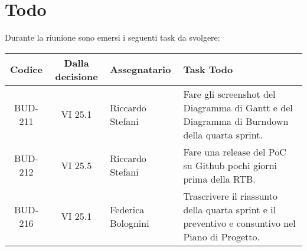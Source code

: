 
\section{Todo}

Durante la riunione sono emersi i seguenti task da svolgere:

\vspace{0.5cm}

\begin{table}[htbp]
\centering
{}
\begin{tabular}{|c|c|p{}|p{}|}
    \hline
    \rowcolor[gray]{0.75}
    \textbf{Codice} & \textbf{Dalla decisione} & \textbf{Assegnatario} & \textbf{Task Todo} \\
    \hline
    BUD-211 & VI 25.1 & Riccardo Stefani & Fare gli screenshot del Diagramma di Gantt e del Diagramma di Burndown della quarta sprint.\\
    \hline
    BUD-212 & VI 25.5 & Riccardo Stefani & Fare una release del PoC su Github pochi giorni prima della RTB.\\
    \hline
    BUD-216 & VI 25.1 & Federica Bolognini & Trascrivere il riassunto della quarta sprint e il preventivo e consuntivo nel Piano di Progetto.\\
    \hline
\end{tabular}
\end{table}